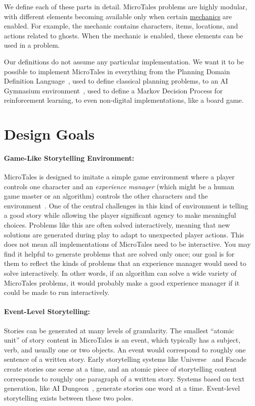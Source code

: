 \documentclass{nilreport}
\begin{document}
\noindent We define each of these parts in detail. MicroTales problems are highly modular, with different elements becoming available only when certain \hyperref[sec:mechanics]{mechanics} are enabled. For example, the  mechanic contains characters, items, locations, and actions related to ghosts. When the  mechanic is enabled, these elements can be used in a problem.

Our definitions do not assume any particular implementation. We want it to be possible to implement MicroTales in everything from the Planning Domain Definition Language~\cite{ghallab1998pddl}, used to define classical planning problems, to an AI Gymnasium environment~\cite{towers2024gymnasium}, used to define a Markov Decision Process for reinforcement learning, to even non-digital implementations, like a board game.

\section{Design Goals}

\paragraph{Game-Like Storytelling Environment:} MicroTales is designed to imitate a simple game environment where a player controls one character and an {\em experience manager} (which might be a human game master or an algorithm) controls the other characters and the environment~\cite{riedl2013interactive}. One of the central challenges in this kind of environment is telling a good story while allowing the player significant agency to make meaningful choices. Problems like this are often solved interactively, meaning that new solutions are generated during play to adapt to unexpected player actions. This does not mean all implementations of MicroTales need to be interactive. You may find it helpful to generate problems that are solved only once; our goal is for them to reflect the kinds of problems that an experience manager would need to solve interactively. In other words, if an algorithm can solve a wide variety of MicroTales problems, it would probably make a good experience manager if it could be made to run interactively.

\paragraph{Event-Level Storytelling:} Stories can be generated at many levels of granularity. The smallest ``atomic unit'' of story content in MicroTales is an event, which typically has a subject, verb, and usually one or two objects. An event would correspond to roughly one sentence of a written story. Early storytelling systems like Universe~\cite{lebowitz1985story} and Facade~\cite{mateas2005structuring} create stories one scene at a time, and an atomic piece of storytelling content corresponds to roughly one paragraph of a written story. Systems based on text generation, like AI Dungeon~\cite{walton2019aidungeon}, generate stories one word at a time. Event-level storytelling exists between these two poles.
\end{document}
